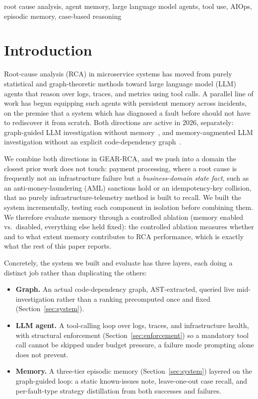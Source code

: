 \documentclass[conference]{IEEEtran}
\begin{document}
\begin{IEEEkeywords}
root cause analysis, agent memory, large language model agents, tool use, AIOps, episodic memory,
case-based reasoning
\end{IEEEkeywords}

\section{Introduction}

Root-cause analysis (RCA) in microservice systems has moved from purely statistical and graph-theoretic methods
toward large language model (LLM) agents that reason over logs, traces, and metrics using tool calls. A parallel
line of work has begun equipping such agents with persistent memory across incidents, on the premise that a
system which has diagnosed a fault before should not have to rediscover it from scratch. Both directions are
active in 2026, separately: graph-guided LLM investigation without memory~\cite{gala}, and memory-augmented LLM
investigation without an explicit code-dependency graph~\cite{amerrcl,opsmem}.

We combine both directions in GEAR-RCA, and we push into a domain the closest prior work does not touch:
payment processing, where a root cause is frequently not an infrastructure failure but a \emph{business-domain
state fact}, such as an anti-money-laundering (AML) sanctions hold or an idempotency-key collision, that no
purely infrastructure-telemetry method is built to recall. We built the system incrementally, testing each
component in isolation before combining them. We therefore evaluate memory through a controlled ablation
(memory enabled vs.\ disabled, everything else held fixed): the controlled ablation measures whether and to
what extent memory contributes to RCA performance, which is exactly what the rest of this paper reports.

Concretely, the system we built and evaluate has three layers, each doing a distinct job rather than
duplicating the others:
\label{sec:intro-arch}

\begin{itemize}
\item \textbf{Graph.} An actual code-dependency graph, AST-extracted, queried live mid-investigation rather than
a ranking precomputed once and fixed (Section~\ref{sec:system}).
\item \textbf{LLM agent.} A tool-calling loop over logs, traces, and infrastructure health, with structural
enforcement (Section~\ref{sec:enforcement}) so a mandatory tool call cannot be skipped under budget pressure, a
failure mode prompting alone does not prevent.
\item \textbf{Memory.} A three-tier episodic memory (Section~\ref{sec:system}) layered on the graph-guided loop:
a static known-issues note, leave-one-out case recall, and per-fault-type strategy distillation from both
successes and failures.
\end{itemize}
\end{document}
